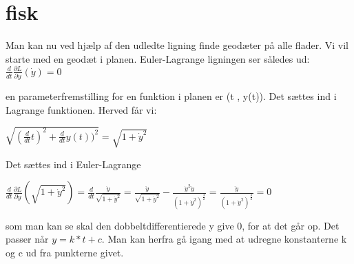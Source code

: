 \section{fisk}
Man kan nu ved hjælp af den udledte ligning finde geodæter på alle flader. Vi vil starte med en geodæt i planen. Euler-Lagrange ligningen ser således ud:
$\frac{d}{dt} \frac{\partial L}{\partial \dot{y}}(\dot{y})=0$

en parameterfremstilling for en funktion i planen er (t , y(t)). Det sættes ind i Lagrange funktionen. Herved får vi:

$\sqrt{(\frac{d}{dt}t)^2+\frac{d}{dt}y(t))^2}=\sqrt{1+\dot{y}^2}$

Det sættes ind i Euler-Lagrange

$\frac{d}{dt} \frac{\partial L}{\partial \dot{y}}(\sqrt{1+\dot{y}^2})=\frac{d}{dt} \frac{\dot{y}}{\sqrt{1+\dot{y}^2}} = \frac{\ddot{y}}{\sqrt{1+\dot{y}^2}}-\frac{\dot{y}^2\ddot{y}}{(1+\dot{y}^2)^\frac{3}{2}}=\frac{\ddot{y}}{(1+\dot{y}^2)^\frac{3}{2}}=0$

som man kan se skal den dobbeltdifferentierede y give 0, for at det går op. Det passer når $y=k*t+c$. Man kan herfra gå igang med at udregne konstanterne k og c ud fra punkterne givet.
